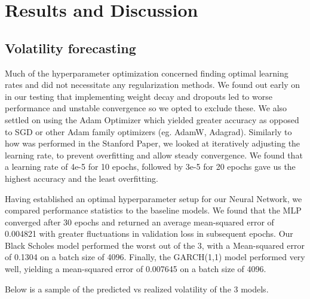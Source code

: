 \documentclass[10pt]{article}
\begin{document}
\section{Results and Discussion}

\subsection{Volatility forecasting}
 Much of the hyperparameter optimization concerned finding optimal learning rates and did not necessitate any regularization methods. We found out early on in our testing that implementing weight decay and dropouts led to worse performance and unstable convergence so we opted to exclude these. We also settled on using the Adam Optimizer which yielded greater accuracy as opposed to SGD or other Adam family optimizers (eg. AdamW, Adagrad). Similarly to how was performed in the Stanford Paper, we looked at iteratively adjusting the learning rate, to prevent overfitting and allow steady convergence. We found that a learning rate of 4e-5 for 10 epochs, followed by 3e-5 for 20 epochs gave us the highest accuracy and the least overfitting.

Having established an optimal hyperparameter setup for our Neural Network, we compared performance statistics to the baseline models. We found that the MLP converged after 30 epochs and returned an average mean-squared error of 0.004821 with greater fluctuations in validation loss in subsequent epochs. Our Black Scholes model performed the worst out of the 3, with a Mean-squared error of 0.1304 on a batch size of 4096. Finally, the GARCH(1,1) model performed very well, yielding a mean-squared error of 0.007645 on a batch size of 4096. 

Below is a sample of the predicted vs realized volatility of the 3 models. 
\end{document}
